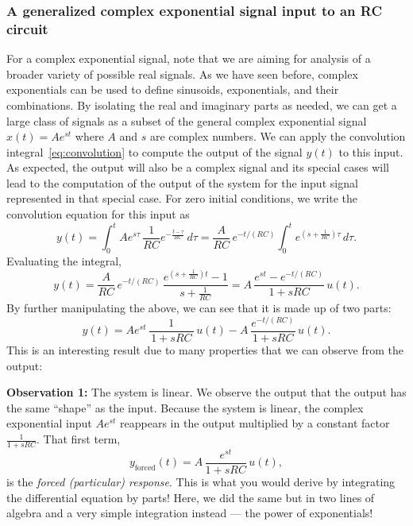 \subsubsection{A generalized complex exponential signal input to an RC circuit}
For a complex exponential signal, note that we are aiming for analysis of a broader variety of possible real signals. As we have seen before, complex exponentials can be used to define sinusoids, exponentials, and their combinations. By isolating the real and imaginary parts as needed, we can get a large class of signals as a subset of the general complex exponential signal $x(t) = A e^{st}$ where $A$ and $s$ are complex numbers. We can apply the convolution integral~\eqref{eq:convolution} to compute the output of the signal $y(t)$ to this input. As expected, the output will also be a complex signal and its special cases will lead to the computation of the output of the system for the input signal represented in that special case. 
For zero initial conditions, we write the convolution equation for this input as
\[
y(t)=\int_{0}^{t} A e^{s\tau}\,\frac{1}{RC}e^{-\frac{t-\tau}{RC}}\,d\tau
= \frac{A}{RC}\,e^{-t/(RC)} \int_{0}^{t} e^{\left(s+\frac{1}{RC}\right)\tau}\,d\tau.
\]
Evaluating the integral,
\[
y(t)= \frac{A}{RC}\,e^{-t/(RC)}\,\frac{e^{\left(s+\frac{1}{RC}\right)t}-1}{\,s+\frac{1}{RC}\,}
= A\,\frac{e^{s t}-e^{-t/(RC)}}{\,1+sRC\,}\,u(t).
\]
By further manipulating the above, we can see that it is made up of two parts:
\begin{equation}
    \label{eq:output-complex}
y(t) = Ae^{st}\,\frac{1}{\,1+sRC\,}\,u(t) - A\,\frac{e^{-t/(RC)}}{\,1+sRC\,}\,u(t).
\end{equation}
This is an interesting result due to many properties that we can observe from the output:

\textbf{Observation 1:} The system is linear. We observe the output that the output has the same ``shape'' as the input. Because the system is linear, the complex exponential input $A e^{st}$ reappears in the output multiplied by a constant factor $\frac{1}{1+sRC}$. That first term,
  \[
  y_{\text{forced}}(t)=A\,\frac{e^{st}}{1+sRC}\,u(t),
  \]
  is the \emph{forced (particular) response}. This is what you would derive by integrating the differential equation by parts! Here, we did the same but in two lines of algebra and a very simple integration instead --- the power of exponentials!

